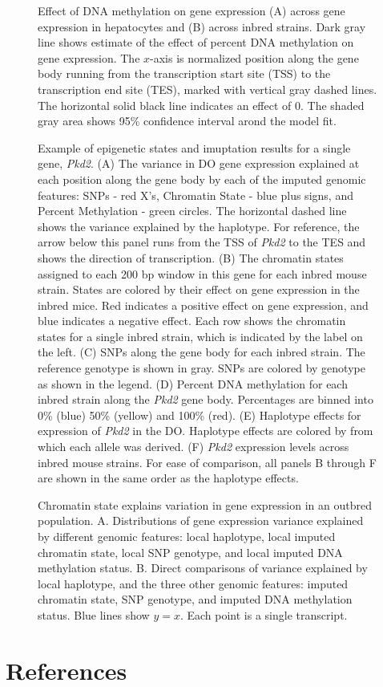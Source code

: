 \documentclass[10pt,letterpaper]{article}
\begin{document}
\begin{figure}[ht]
\centering
\caption{Effect of DNA methylation on gene expression (A) across gene expression
in hepatocytes and (B) across inbred strains. Dark gray line shows estimate
of the effect of percent DNA methylation on gene expression. The $x$-axis is
normalized position along the gene body running from the transcription start
site (TSS) to the transcription end site (TES), marked with vertical gray dashed
lines. The horizontal solid black line indicates an effect of 0. 
The shaded gray area shows 95\% confidence interval arond the model fit.}
\label{fig:DNA_methylation_effect}
\end{figure}

\begin{figure}[ht]
\centering
\caption{Example of epigenetic states and imuptation results for a single 
gene, \textit{Pkd2}. (A) The variance in DO gene expression explained at 
each position along the gene body by each of the imputed genomic 
features: SNPs - red X's, Chromatin State - blue plus signs, and 
Percent Methylation - green circles. The horizontal dashed line shows 
the variance explained by the haplotype. For reference, the arrow 
below this panel runs from the TSS of \textit{Pkd2} to the TES and 
shows the direction of transcription. (B) The chromatin states assigned 
to each 200 bp window in this gene for each inbred mouse strain. States 
are colored by their effect on gene expression in the inbred mice. Red 
indicates a positive effect on gene expression, and blue indicates a 
negative effect. Each row shows the chromatin states for a single inbred 
strain, which is indicated by the label on the left. (C) SNPs along the 
gene body for each inbred strain. The reference genotype is shown in gray. 
SNPs are colored by genotype as shown in the legend. (D) Percent DNA 
methylation for each inbred strain along the \textit{Pkd2} gene body. 
Percentages are binned into 0\% (blue) 50\% (yellow) and 100\% (red). 
(E) Haplotype effects for expression of \textit{Pkd2} in the DO. 
Haplotype effects are colored by from which each allele was derived. 
(F) \textit{Pkd2} expression levels across inbred mouse strains. For 
ease of comparison, all panels B through F are shown in the same order 
as the haplotype effects.}
\label{fig:example_gene}
\end{figure}

\begin{figure}[ht]
\centering
\caption{Chromatin state explains variation in gene expression in an outbred 
population. A. Distributions of gene expression variance explained by different 
genomic features: local haplotype, local imputed chromatin state, local SNP 
genotype, and local imputed DNA methylation status. B. Direct comparisons of 
variance explained by local haplotype, and the three other genomic features: 
imputed chromatin state, SNP genotype, and imputed DNA methylation status. 
Blue lines show $y = x$. Each point is a single transcript.}
\label{fig:effect_distrubutions}
\end{figure}

\pagebreak

\hypertarget{references}{%
\section*{References}\label{references}}

\nolinenumbers
\end{document}
